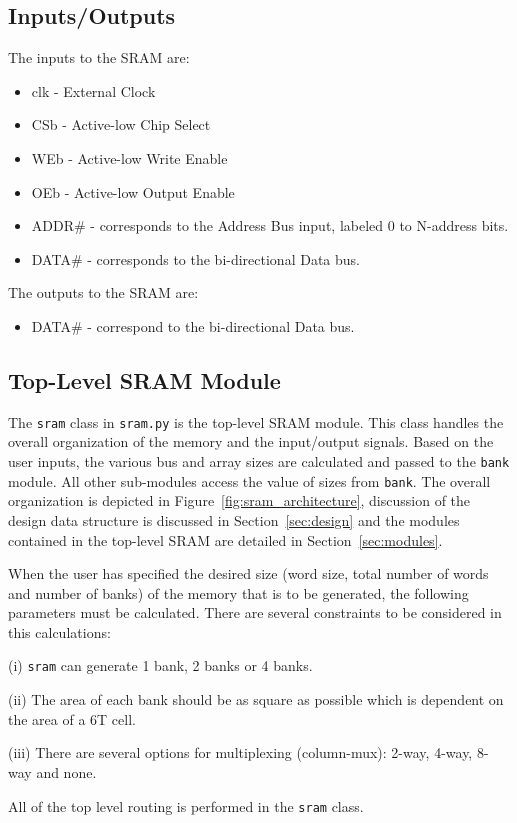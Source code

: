 \subsection{Inputs/Outputs}
\label{sec:io}

The inputs to the SRAM are: 
\begin{itemize}
\setlength{\itemsep}{0pt}
\item clk - External Clock
\item CSb - Active-low Chip Select
\item WEb - Active-low Write Enable
\item OEb - Active-low Output Enable
\item ADDR\# - corresponds to the Address Bus input, labeled 0 to N-address bits.
\item DATA\# - corresponds to the bi-directional Data bus.
\end{itemize}

The outputs to the SRAM are: 
\begin{itemize}
\setlength{\itemsep}{0pt}
\item DATA\# - correspond to the bi-directional Data bus.
\end{itemize}


\subsection{Top-Level SRAM Module}
\label{sec:sram}

The \verb|sram| class in \verb|sram.py| is the top-level SRAM module.
This class handles the overall organization of the memory and the
input/output signals.  Based on the user inputs, the various bus and
array sizes are calculated and passed to the \verb|bank| module.
All other sub-modules access the value of sizes from \verb|bank|. 
The overall organization is depicted in
Figure~\ref{fig:sram_architecture}, discussion of the design data
structure is discussed in Section~\ref{sec:design} and the modules
contained in the top-level SRAM are detailed in
Section~\ref{sec:modules}.

When the user has specified the desired size (word size, total
number of words and number of banks) of the memory that is to be generated, 
the following parameters must be calculated. There are several constraints 
to be considered in this calculations:

(i) \verb|sram| can generate 1 bank, 2 banks or 4 banks.

(ii) The area of each bank should be as square as possible which is dependent on the area of a 6T cell.

(iii) There are several options for multiplexing (column-mux): 2-way, 4-way, 8-way  and none.


All of the top level routing is performed in the \verb|sram| class.

